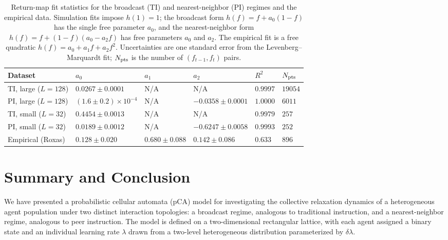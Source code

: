 \documentclass[a4paper,fleqn]{cas-sc}
\begin{document}
    \begin{table}[htbp]
    \caption{Return-map fit statistics for the broadcast (TI) and nearest-neighbor (PI) regimes and the empirical data. Simulation fits impose $h(1)=1$; the broadcast form $h(f)=f+a_0(1-f)$ has the single free parameter $a_0$, and the nearest-neighbor form $h(f)=f+(1-f)(a_0-a_2 f)$ has free parameters $a_0$ and $a_2$. The empirical fit is a free quadratic $h(f)=a_0+a_1 f+a_2 f^2$. Uncertainties are one standard error from the Levenberg--Marquardt fit; $N_{\rm pts}$ is the number of $(f_{t-1},f_t)$ pairs.}
    \label{tbl:returnmapfits}
    \begin{tabular*}{\tblwidth}{@{}LLLLLL@{}}
    \toprule
    Dataset & $a_0$ & $a_1$ & $a_2$ & $R^2$ & $N_{\rm pts}$ \\
    \midrule
    TI, large ($L=128$) & $0.0267\pm0.0001$ & N/A & N/A & $0.9997$ & $19054$ \\
    PI, large ($L=128$) & $(1.6\pm0.2)\times10^{-4}$ & N/A & $-0.0358\pm0.0001$ & $1.0000$ & $6011$ \\
    TI, small ($L=32$) & $0.4454\pm0.0013$ & N/A & N/A & $0.9979$ & $257$ \\
    PI, small ($L=32$) & $0.0189\pm0.0012$ & N/A & $-0.6247\pm0.0058$ & $0.9993$ & $252$ \\
    Empirical (Roxas) & $0.128\pm0.020$ & $0.680\pm0.088$ & $0.142\pm0.086$ & $0.633$ & $896$ \\
    \bottomrule
    \end{tabular*}
    \end{table}

\clearpage
\section{Summary and Conclusion}

We have presented a probabilistic cellular automata (pCA) model for investigating the collective relaxation dynamics of a heterogeneous agent population under two distinct interaction topologies: a broadcast regime, analogous to traditional instruction, and a nearest-neighbor regime, analogous to peer instruction.
The model is defined on a two-dimensional rectangular lattice, with each agent assigned a binary state and an individual learning rate $\lambda$ drawn from a two-level heterogeneous distribution parameterized by $\delta\lambda$.
\end{document}
